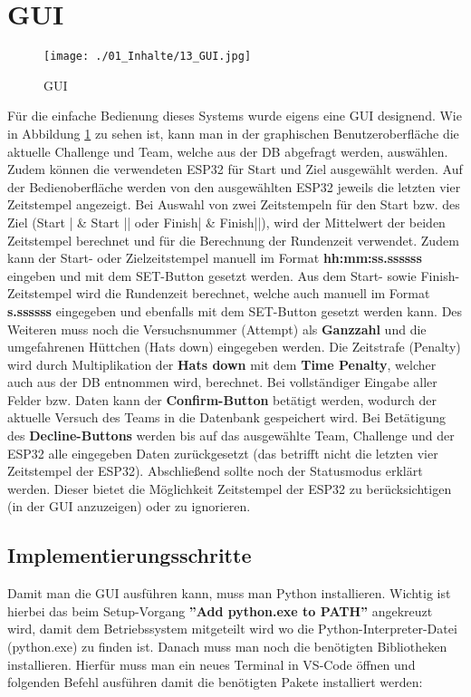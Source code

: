 
\section{\acl{GUI}}
\label{sec:GUI}

\begin{figure}[H]
	\texttt{[image: ./01\_Inhalte/13\_GUI.jpg]}
	\centering
	\caption{\ac{GUI}}
	\label{fig:GUI}
\end{figure}

Für die einfache Bedienung dieses Systems wurde eigens eine \ac{GUI} designend. Wie in Abbildung \ref{fig:GUI} zu sehen ist, kann man in der graphischen Benutzeroberfläche die aktuelle Challenge und Team, welche aus der \ac{DB} abgefragt werden, auswählen. Zudem können die verwendeten ESP32 für Start und Ziel ausgewählt werden. Auf der Bedienoberfläche werden von den ausgewählten ESP32 jeweils die letzten vier Zeitstempel angezeigt. Bei Auswahl von zwei Zeitstempeln für den Start bzw. des Ziel (Start | \& Start || oder Finish| \& Finish||), wird der Mittelwert der beiden Zeitstempel berechnet und für die Berechnung der Rundenzeit verwendet. Zudem kann der Start- oder Zielzeitstempel manuell im Format \textbf{hh:mm:ss.ssssss} eingeben und mit dem SET-Button gesetzt werden. Aus dem Start- sowie Finish-Zeitstempel wird die Rundenzeit berechnet, welche auch manuell im Format \textbf{s.ssssss} eingegeben und ebenfalls mit dem SET-Button gesetzt werden kann. Des Weiteren muss noch die Versuchsnummer (Attempt) als \textbf{Ganzzahl} und die umgefahrenen Hüttchen (Hats down) eingegeben werden. Die Zeitstrafe (Penalty) wird durch Multiplikation der \textbf{Hats down} mit dem \textbf{Time Penalty}, welcher auch aus der \ac{DB} entnommen wird, berechnet. Bei vollständiger Eingabe aller Felder bzw. Daten kann der \textbf{Confirm-Button} betätigt werden, wodurch der aktuelle Versuch des Teams in die Datenbank gespeichert wird. Bei Betätigung des \textbf{Decline-Buttons} werden bis auf das ausgewählte Team, Challenge und der ESP32 alle eingegeben Daten zurückgesetzt (das betrifft nicht die letzten vier Zeitstempel der ESP32). Abschließend sollte noch der Statusmodus erklärt werden. Dieser bietet die Möglichkeit Zeitstempel der ESP32 zu berücksichtigen (in der \ac{GUI} anzuzeigen) oder zu ignorieren.


\subsection{Implementierungsschritte}
Damit man die \ac{GUI} ausführen kann, muss man Python installieren. Wichtig ist hierbei das beim Setup-Vorgang \textbf{''Add python.exe to PATH''} angekreuzt wird, damit dem Betriebssystem mitgeteilt wird wo die Python-Interpreter-Datei (python.exe) zu finden ist. Danach muss man noch die benötigten Bibliotheken installieren. Hierfür muss man ein neues Terminal in VS-Code öffnen und folgenden Befehl ausführen damit die benötigten Pakete installiert werden:

